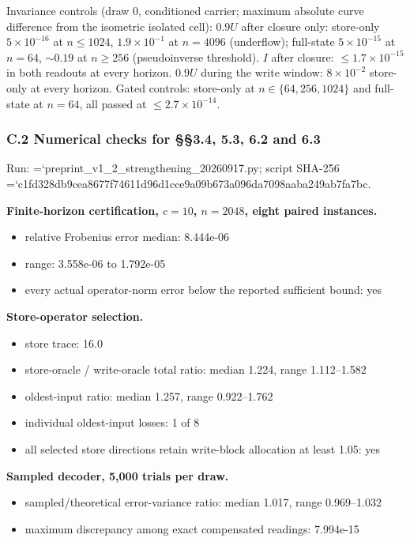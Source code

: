 \documentclass[
  10pt,
]{article}
\providecommand{\tightlist}{%
  \setlength{\itemsep}{0pt}\setlength{\parskip}{0pt}}
\renewcommand{\texttt}[1]{\begingroup\ttfamily\hyphenchar\font=`\-\relax\spaceskip=0pt\hskip0pt\allowbreak#1\endgroup}
\begin{document}
Invariance controls (draw 0, conditioned carrier; maximum absolute curve
difference from the isometric isolated cell): \(0.9U\) after closure
only: store-only \(5\times10^{-16}\) at \(n\le1024\),
\(1.9\times10^{-1}\) at \(n=4096\) (underflow); full-state
\(5\times10^{-15}\) at \(n=64\), \(\sim0.19\) at \(n\ge256\)
(pseudoinverse threshold). \(I\) after closure: \(\le1.7\times10^{-15}\)
in both readouts at every horizon. \(0.9U\) during the write window:
\(8\times10^{-2}\) store-only at every horizon. Gated controls:
store-only at \(n\in\{64,256,1024\}\) and full-state at \(n=64\), all
passed at \(\le2.7\times10^{-14}\).

\subsubsection{C.2 Numerical checks for §§3.4, 5.3, 6.2 and
6.3}\label{c.2-numerical-checks-for-3.4-5.3-6.2-and-6.3}

Run: \texttt{preprint\_v1\_2\_strengthening\_20260917.py}; script
SHA-256
\texttt{c1fd328db9cea8677f74611d96d1cce9a09b673a096da7098aaba249ab7fa7bc}.

\textbf{Finite-horizon certification, \(c=10\), \(n=2048\), eight paired
instances.}

\begin{itemize}
\tightlist
\item
  relative Frobenius error median: 8.444e-06
\item
  range: 3.558e-06 to 1.792e-05
\item
  every actual operator-norm error below the reported sufficient bound:
  yes
\end{itemize}

\textbf{Store-operator selection.}

\begin{itemize}
\tightlist
\item
  store trace: 16.0
\item
  store-oracle / write-oracle total ratio: median 1.224, range
  1.112--1.582
\item
  oldest-input ratio: median 1.257, range 0.922--1.762
\item
  individual oldest-input losses: 1 of 8
\item
  all selected store directions retain write-block allocation at least
  1.05: yes
\end{itemize}

\textbf{Sampled decoder, 5,000 trials per draw.}

\begin{itemize}
\tightlist
\item
  sampled/theoretical error-variance ratio: median 1.017, range
  0.969--1.032
\item
  maximum discrepancy among exact compensated readings: 7.994e-15
\end{itemize}
\end{document}
